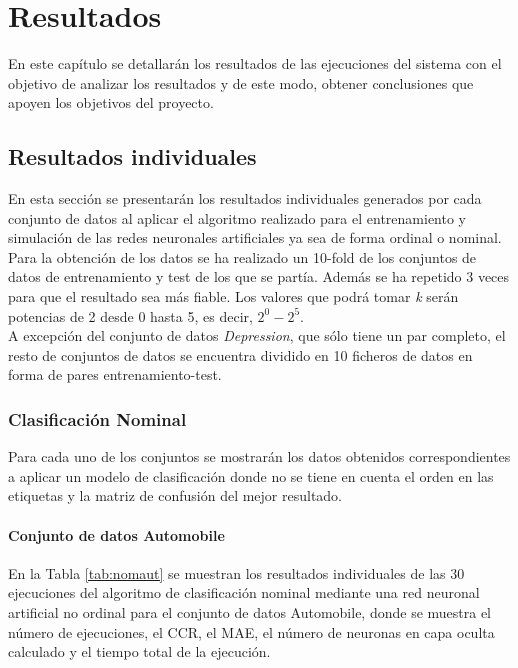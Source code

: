 \chapter{Resultados}
	
	En este capítulo se detallarán los resultados de las ejecuciones del sistema con el objetivo de analizar los resultados y de este modo, obtener conclusiones que apoyen los objetivos del proyecto.
	
	\section{Resultados individuales}
		
		En esta sección se presentarán los resultados individuales generados por cada conjunto de datos al aplicar el algoritmo realizado para el entrenamiento y simulación de las redes neuronales artificiales ya sea de forma ordinal o nominal.\\
		
		Para la obtención de los datos se ha realizado un 10-fold de los conjuntos de datos de entrenamiento y test de los que se partía. Además se ha repetido 3 veces para que el resultado sea más fiable. Los valores que podrá tomar \textit{k} serán potencias de 2 desde 0 hasta 5, es decir, $2^0 - 2^5$.\\
		
		A excepción del conjunto de datos \textit{Depression}, que sólo tiene un par completo, el resto de conjuntos de datos se encuentra dividido en 10 ficheros de datos en forma de pares entrenamiento-test.
		
		\subsection{Clasificación Nominal}
		
			Para cada uno de los conjuntos se mostrarán los datos obtenidos correspondientes a aplicar un modelo de clasificación donde no se tiene en cuenta el orden en las etiquetas y la matriz de confusión del mejor resultado.
			
			\subsubsection{Conjunto de datos Automobile}
			
			En la Tabla \ref{tab:nomaut} se muestran los resultados individuales de las 30 ejecuciones del algoritmo de clasificación nominal mediante una red neuronal artificial no ordinal para el conjunto de datos Automobile, donde se muestra el número de ejecuciones, el CCR, el MAE, el número de neuronas en capa oculta calculado y el tiempo total de la ejecución.\\
			
